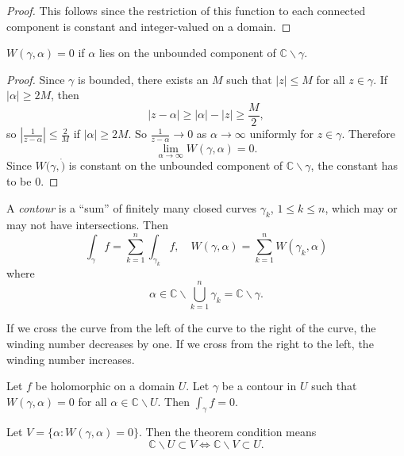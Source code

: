 \begin{proof}
This follows since the restriction of this function to each connected
component is constant and integer-valued on a domain.
\end{proof}

\begin{lemma}
$W(\gamma, \alpha) = 0$ if $\alpha$ lies on the unbounded component of
$\mathbb{C} \backslash \gamma$.
\end{lemma}

\begin{proof}
Since $\gamma$ is bounded, there exists an $M$ such that $|z| \leq M$ for all
$z \in \gamma$. If $|\alpha| \geq 2 M$, then
$$
|z - \alpha| \geq |\alpha| - |z| \geq \frac{M}{2},
$$
so $\left|\frac{1}{z - \alpha}\right| \leq \frac{2}{M}$ if
$|\alpha| \geq 2 M$. So $\frac{1}{z - \alpha} \to 0$ as
$\alpha \to \infty$ uniformly for $z \in \gamma$. Therefore
$$
\lim_{\alpha \to \infty} W(\gamma, \alpha) = 0.
$$
Since $W(\gamma, \dot)$ is constant on the unbounded component
of $\mathbb{C} \backslash \gamma$, the constant has to be 0.
\end{proof}

\begin{defn}[Contour]
A \emph{contour} is a ``sum'' of finitely many closed curves
$\gamma_k$, $1 \leq k \leq n$, which may or may not have intersections.
Then
$$
\int_\gamma f = \sum_{k=1}^n \int_{\gamma_k} f, \quad
W(\gamma, \alpha) = \sum_{k=1}^n W(\gamma_k, \alpha)
$$
where
$$
\alpha \in \mathbb{C} \backslash \bigcup_{k=1}^n \gamma_k
       =   \mathbb{C} \backslash \gamma.
$$
\end{defn}

If we cross the curve from the left of the curve to the right
of the curve, the winding number decreases by one. If we cross
from the right to the left, the winding number increases.

\begin{theorem}
Let $f$ be holomorphic on a domain $U$. Let $\gamma$ be a
contour in $U$ such that $W(\gamma, \alpha) = 0$ for all
$\alpha \in \mathbb{C} \backslash U$. Then $\int_\gamma f = 0$.
\end{theorem}

\begin{xmpl}
Let $V = \{ \alpha : W(\gamma, \alpha) = 0 \}$. Then the theorem
condition means
$$
\mathbb{C} \backslash U \subset V
\iff
\mathbb{C} \backslash V \subset U.
$$
\end{xmpl}

